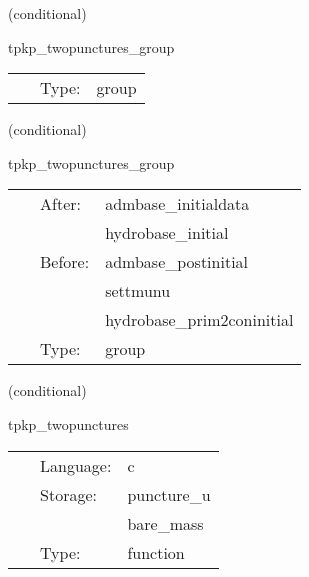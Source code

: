    (conditional) 

\hspace{5mm} tpkp\_twopunctures\_group 

\hspace{5mm}{\it twopunctures initial data group } 


\hspace{5mm}

 \begin{tabular*}{160mm}{cll} 
~ & Type:  & group \\ 
\end{tabular*} 


\vspace{5mm}

   (conditional) 

\hspace{5mm} tpkp\_twopunctures\_group 

\hspace{5mm}{\it twopunctures initial data group } 


\hspace{5mm}

 \begin{tabular*}{160mm}{cll} 
~ & After:  & admbase\_initialdata \\ 
~& ~ &hydrobase\_initial\\ 
~ & Before:  & admbase\_postinitial \\ 
~& ~ &settmunu\\ 
~& ~ &hydrobase\_prim2coninitial\\ 
~ & Type:  & group \\ 
\end{tabular*} 


\vspace{5mm}

   (conditional) 

\hspace{5mm} tpkp\_twopunctures 

\hspace{5mm}{\it create puncture black hole initial data } 


\hspace{5mm}

 \begin{tabular*}{160mm}{cll} 
~ & Language:  & c \\ 
~ & Storage:  & puncture\_u \\ 
~& ~ &bare\_mass\\ 
~ & Type:  & function \\ 
\end{tabular*} 


